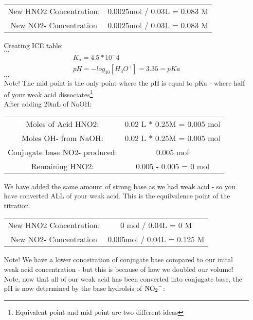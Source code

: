 \documentclass{article}  %
\begin{document}
\begin{center}
    \begin{tabular}{ c c }
        New HNO2 Concentration: & 0.0025mol / 0.03L = 0.083 M \\
        New NO2- Concentration & 0.0025mol / 0.03L  = 0.083 M 
    \end{tabular}
\end{center}
Creating ICE table: \\
$\cdots$ %
\begin{equation*}
    \begin{aligned}
        K_a = 4.5 *10^-4 \\
        pH = -log_{10}[H_3O^+] = 3.35 = pKa
    \end{aligned}
\end{equation*}
$\cdots$  \\ %
Note! The mid point is the only point where the pH is equal to pKa - where half of your weak acid dissociates\footnote{Equivalent point and mid point are two different ideas} \\
After adding 20mL of NaOH:
\begin{center}
    \begin{tabular}{ c c }
    Moles of Acid HNO2: & 0.02 L * 0.25M = 0.005 mol \\
    Moles OH- from NaOH: & 0.02 L * 0.25M = 0.005 mol \\
    Conjugate base NO2- produced: & 0.005 mol \\
    Remaining HNO2: & 0.005 - 0.005 = 0 mol
    \end{tabular}    
\end{center}
We have added the same amount of strong base as we had weak acid - so you have converted ALL of your weak acid. This is the equilvalence point of the titration.
\begin{center}
    \begin{tabular}{ c c }
        New HNO2 Concentration: & 0 mol / 0.04L = 0 M \\
        New NO2- Concentration & 0.005mol / 0.04L  = 0.125 M 
    \end{tabular}
\end{center}
Note! We have a lower concetration of conjugate base compared to our inital weak acid concentration - but this is because of how we doubled our volume! \\
Note, now that all of our weak acid has been converted into conjugate base, the pH is now determined by the base hydrolsis of $\ce{NO2-}$: \\
\end{document}
